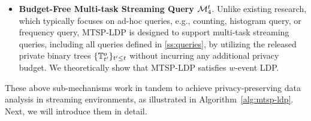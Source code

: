 \begin{itemize}
\item {\textbf{Budget-Free Multi-task Streaming Query $\mathcal{M}_4^t$}}.
Unlike existing research, which typically focuses on ad-hoc queries, e.g., counting, histogram query, or frequency query,
MTSP-LDP is designed to support multi-task streaming queries, including all
queries defined in \cref{ss:queries}, by utilizing the released private binary
trees $\{\mathbb{T}^o_{t'}\}_{t'\leq t}$ without incurring  any additional privacy budget.
We theoretically show that MTSP-LDP satisfies $w$-event LDP.
\end{itemize}

These above sub-mechanisms work in tandem to achieve privacy-preserving data analysis in streaming environments, as illustrated in Algorithm~\ref{alg:mtsp-ldp}. Next, we
will introduce them in detail.

